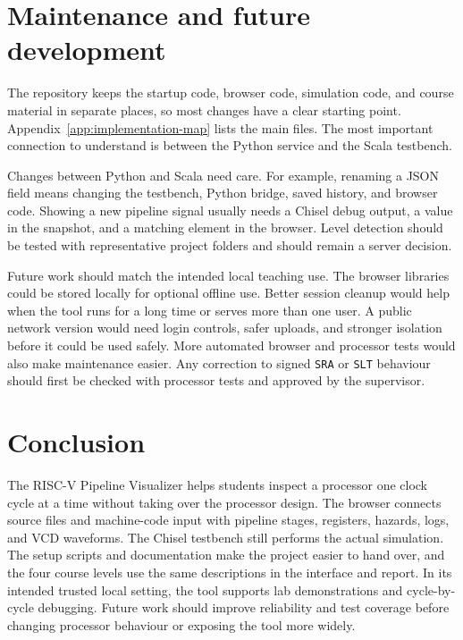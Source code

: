\documentclass[11pt,a4paper]{article}
\begin{document}
\section{Maintenance and future development}\label{sec:maintenance}

The repository keeps the startup code, browser code, simulation code, and course material in separate places, so most changes have a clear starting point. Appendix~\ref{app:implementation-map} lists the main files. The most important connection to understand is between the Python service and the Scala testbench.

Changes between Python and Scala need care. For example, renaming a JSON field means changing the testbench, Python bridge, saved history, and browser code. Showing a new pipeline signal usually needs a Chisel debug output, a value in the snapshot, and a matching element in the browser. Level detection should be tested with representative project folders and should remain a server decision.

Future work should match the intended local teaching use. The browser libraries could be stored locally for optional offline use. Better session cleanup would help when the tool runs for a long time or serves more than one user. A public network version would need login controls, safer uploads, and stronger isolation before it could be used safely. More automated browser and processor tests would also make maintenance easier. Any correction to signed \texttt{SRA} or \texttt{SLT} behaviour should first be checked with processor tests and approved by the supervisor.

\section{Conclusion}\label{sec:conclusion}

The RISC-V Pipeline Visualizer helps students inspect a processor one clock cycle at a time without taking over the processor design. The browser connects source files and machine-code input with pipeline stages, registers, hazards, logs, and VCD waveforms. The Chisel testbench still performs the actual simulation. The setup scripts and documentation make the project easier to hand over, and the four course levels use the same descriptions in the interface and report. In its intended trusted local setting, the tool supports lab demonstrations and cycle-by-cycle debugging. Future work should improve reliability and test coverage before changing processor behaviour or exposing the tool more widely.
\end{document}
